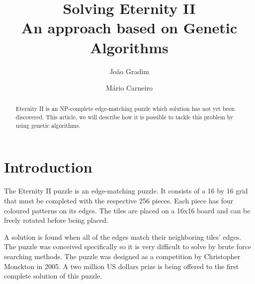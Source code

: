 \documentclass{llncs}
\begin{document}
%
\frontmatter          %
%
\pagestyle{headings}  %
%

\mainmatter              %
%
\title{Solving Eternity II\\
    \small{An approach based on Genetic Algorithms}
  }
  \author{João Gradim \and Mário Carneiro}
%
%

\maketitle              %

\begin{abstract}
Eternity II is an NP-complete edge-matching puzzle which solution has not yet been discovered. This article, we will describe how it is possible to tackle this problem by using genetic algorithms.
\end{abstract}
%
\section{Introduction}\label{sec:introduction}

The Eternity II puzzle is an edge-matching puzzle. It consists of a 16 by 16 grid that must be completed with the respective 256 pieces. Each piece has four coloured patterns on its edges. The tiles are placed on a 16x16 board and can be freely rotated before being placed.

A solution is found when all of the edges match their neighboring tiles' edges. The puzzle was conceived specifically so it is very difficult to solve by brute force searching methods. The puzzle was designed as a competition by Christopher Monckton in 2005. A two million US dollars prize is being offered to the first complete solution of this puzzle.
\end{document}
